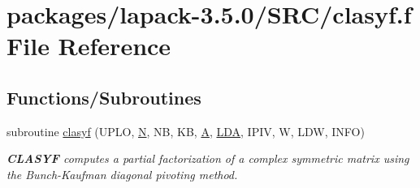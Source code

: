 \hypertarget{clasyf_8f}{}\section{packages/lapack-\/3.5.0/\+S\+R\+C/clasyf.f File Reference}
\label{clasyf_8f}
\subsection*{Functions/\+Subroutines}
\begin{DoxyCompactItemize}
\item 
subroutine \hyperlink{group__complexSYcomputational_ga6ae55c9045ed09e937098d79f7ab3b0f}{clasyf} (U\+P\+L\+O, \hyperlink{polmisc_8c_a0240ac851181b84ac374872dc5434ee4}{N}, N\+B, K\+B, \hyperlink{classA}{A}, \hyperlink{example__user_8c_ae946da542ce0db94dced19b2ecefd1aa}{L\+D\+A}, I\+P\+I\+V, W, L\+D\+W, I\+N\+F\+O)
\begin{DoxyCompactList}\small\item\em {\bfseries C\+L\+A\+S\+Y\+F} computes a partial factorization of a complex symmetric matrix using the Bunch-\/\+Kaufman diagonal pivoting method. \end{DoxyCompactList}\end{DoxyCompactItemize}
